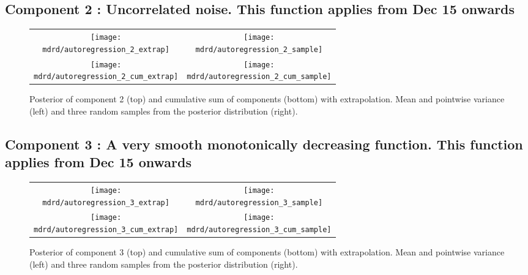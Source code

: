 \documentclass{article} %
\begin{document}
\subsection{Component 2 : Uncorrelated noise. This function applies from Dec   15 onwards}



\begin{figure}[H]
\newcommand{\wmgd}{0.5\columnwidth}
\newcommand{\hmgd}{3.0cm}
\newcommand{\mdrd}{autoregression}
\newcommand{\mbm}{\hspace{-0.3cm}}
\begin{tabular}{cc}
\mbm \texttt{[image: \\mdrd/autoregression\_2\_extrap]} & \texttt{[image: \\mdrd/autoregression\_2\_sample]} \\
\mbm \texttt{[image: \\mdrd/autoregression\_2\_cum\_extrap]} & \texttt{[image: \\mdrd/autoregression\_2\_cum\_sample]}
\end{tabular}
\caption{Posterior of component 2 (top) and cumulative sum of components (bottom) with extrapolation. Mean and pointwise variance (left) and three random samples from the posterior distribution (right).}
\label{fig:extrap2}
\end{figure}

\subsection{Component 3 : A very smooth monotonically decreasing function. This function applies from Dec   15 onwards}



\begin{figure}[H]
\newcommand{\wmgd}{0.5\columnwidth}
\newcommand{\hmgd}{3.0cm}
\newcommand{\mdrd}{autoregression}
\newcommand{\mbm}{\hspace{-0.3cm}}
\begin{tabular}{cc}
\mbm \texttt{[image: \\mdrd/autoregression\_3\_extrap]} & \texttt{[image: \\mdrd/autoregression\_3\_sample]} \\
\mbm \texttt{[image: \\mdrd/autoregression\_3\_cum\_extrap]} & \texttt{[image: \\mdrd/autoregression\_3\_cum\_sample]}
\end{tabular}
\caption{Posterior of component 3 (top) and cumulative sum of components (bottom) with extrapolation. Mean and pointwise variance (left) and three random samples from the posterior distribution (right).}
\label{fig:extrap3}
\end{figure}
\end{document}

